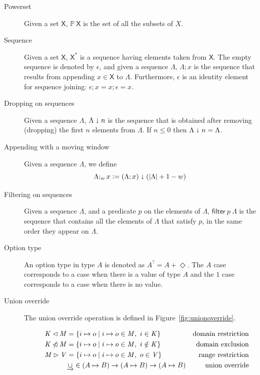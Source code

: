 \documentclass[11pt,a4paper]{article}
\newcommand{\powerset}[1]{\mathbb{P}~#1}
\newcommand{\restrictdom}{\lhd}
\newcommand{\subtractdom}{\mathbin{\slashed{\restrictdom}}}
\newcommand{\restrictrange}{\rhd}
\newcommand{\unionoverride}{\mathbin{\underrightarrow\cup}}
\newcommand{\var}[1]{\mathit{#1}}
\newcommand{\fun}[1]{\mathsf{#1}}
\newcommand{\type}[1]{\mathsf{#1}}
\newcommand{\size}[1]{\left| #1 \right|}
\newcommand{\seqof}[1]{#1^{*}}
\newcommand{\leteq}{\ensuremath{\mathrel{\mathop:}=}}
\newcommand{\Nothing}{\Diamond}
\begin{document}
\begin{description}
\item[Powerset] Given a set $\type{X}$, $\powerset{\type{X}}$ is the set of all
  the subsets of $X$.
\item[Sequence] Given a set $\type{X}$, $\seqof{\type{X}}$ is a sequence
  having elements taken from $\type{X}$.
  The empty sequence is denoted by $\epsilon$, and given a sequence $\Lambda$,
  $\Lambda; x$ is the sequence that results from appending
  $x \in \type{X}$ to $\Lambda$.
  Furthermore, $\epsilon$ is an identity element for sequence joining:
  $\epsilon; x = x; \epsilon = x$.
\item[Dropping on sequences] Given a sequence $\Lambda$,
  $\Lambda \shortdownarrow n$ is the sequence that is obtained after removing
  (dropping) the first $n$ elements from $\Lambda$. If $n \leq 0$ then
  $\Lambda \shortdownarrow n = \Lambda$.
\item[Appending with a moving window] Given a sequence $\Lambda$, we define
  $$\Lambda ;_w x \leteq (\Lambda; x) \shortdownarrow (\size{\Lambda} + 1 - w)$$
\item[Filtering on sequences] Given a sequence $\Lambda$, and a predicate $p$
  on the elements of $\Lambda$, $\fun{filter}~p~\Lambda$ is the sequence that
  contains all the elements of $\Lambda$ that satisfy $p$, in the same order
  they appear on $\Lambda$.
\item[Option type] An option type in type $A$ is denoted as $A^? = A + \Nothing$. The
  $A$ case corresponds to a case when there is a value of type $A$ and the $1$
  case corresponds to a case when there is no value.
\item[Union override] The union override operation is defined in
  Figure~\ref{fig:unionoverride}.
  \begin{figure}
    \begin{align*}
      \var{K} \restrictdom \var{M}
      & = \{ i \mapsto o \mid i \mapsto o \in \var{M}, ~ i \in \var{K} \}
      & \text{domain restriction}
      \\
      \var{K} \subtractdom \var{M}
      & = \{ i \mapsto o \mid i \mapsto o \in \var{M}, ~ i \notin \var{K} \}
      & \text{domain exclusion}
      \\
      \var{M} \restrictrange \var{V}
      & = \{ i \mapsto o \mid i \mapsto o \in \var{M}, ~ o \in \var{V} \}
      & \text{range restriction}
      \\
      & \unionoverride \in (A \mapsto B) \to (A \mapsto B) \to (A \mapsto B)
      & \text{union override}\\

\end{align*}
\end{figure}
\end{description}
\end{document}
